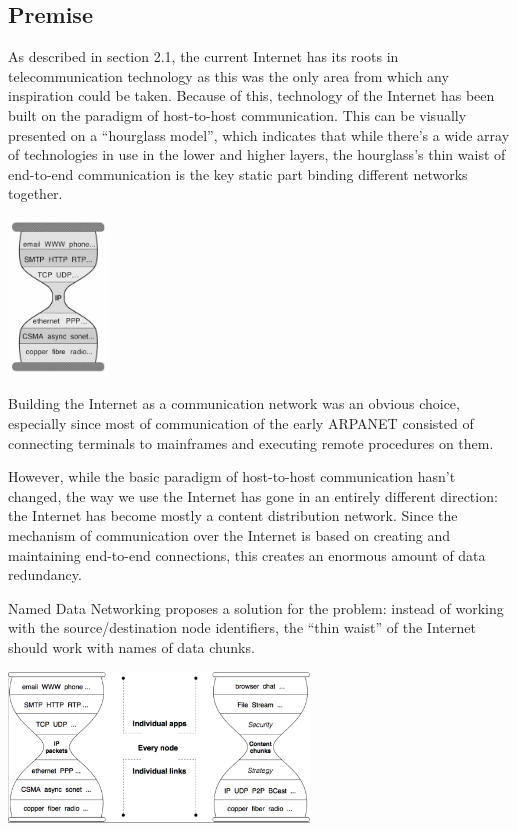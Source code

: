         \subsection{Premise}
            As described in section 2.1, the current Internet has its roots in telecommunication technology as this was the only area from which any inspiration could be taken. Because of this, technology of the Internet has been built on the paradigm of host-to-host communication. This can be visually presented on a ``hourglass model'', which indicates that while there's a wide array of technologies in use in the lower and higher layers, the hourglass's thin waist of end-to-end communication is the key static part binding different networks together.

            \begin{center}\includegraphics[width=0.2\textwidth]{media/ndn_hourglass1.jpg}\end{center}

            Building the Internet as a communication network was an obvious choice, especially since most of communication of the early ARPANET consisted of connecting terminals to mainframes and executing remote procedures on them.

            However, while the basic paradigm of host-to-host communication hasn't changed, the way we use the Internet has gone in an entirely different direction: the Internet has become mostly a content distribution network. Since the mechanism of communication over the Internet is based on creating and maintaining end-to-end connections, this creates an enormous amount of data redundancy.

            Named Data Networking proposes a solution for the problem: instead of working with the source/destination node identifiers, the ``thin waist'' of the Internet should work with names of data chunks.

            \begin{center}\includegraphics[width=0.6\textwidth]{media/ndn_hourglass2.png}\end{center}

